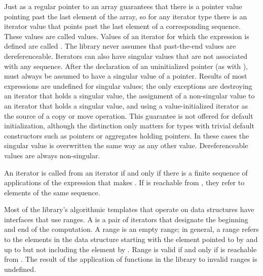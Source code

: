 \pnum
Just as a regular pointer to an array guarantees that there is a pointer value pointing past the last element
of the array, so for any iterator type there is an iterator value that points past the last element of a
corresponding sequence.
These values are called
values.
Values of an iterator
for which the expression
is defined are called
.
The library never assumes that past-the-end values are dereferenceable.
Iterators can also have singular values that are not associated with any
sequence.
\enterexample
After the declaration of an uninitialized pointer
(as with
),
must always be assumed to have a singular value of a pointer.
\exitexample
Results of most expressions are undefined for singular values;
the only exceptions are destroying an iterator that holds a singular value,
the assignment of a non-singular value to
an iterator that holds a singular value, and using a value-initialized iterator
as the source of a copy or move operation. \enternote This guarantee is not
offered for default initialization, although the distinction only matters for types
with trivial default constructors such as pointers or aggregates holding pointers.
\exitnote
In these cases the singular
value is overwritten the same way as any other value.
Dereferenceable
values are always non-singular.


\pnum
An iterator
is called
from an iterator
if and only if there is a finite sequence of applications of
the expression
that makes
.
If
is reachable from
,
they refer to elements of the same sequence.

\pnum
Most of the library's algorithmic templates that operate on data structures have interfaces that use ranges.
A
is a pair of iterators that designate the beginning and end of the computation.
A range 
is an empty range;
in general, a range 
refers to the elements in the data structure starting with the element
pointed to by
and up to but not including the element  by
.
Range 
is valid if and only if
is reachable from
.
The result of the application of functions in the library to invalid ranges is
undefined.

